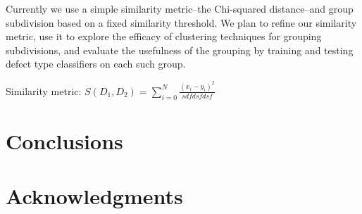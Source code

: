 \documentclass{sig-alternate-05-2015}
\begin{document}
Currently we use a simple similarity metric--the Chi-squared distance--and group subdivision
based on a fixed similarity threshold. We plan to refine our similarity metric, use it
to explore the efficacy of clustering techniques for grouping subdivisions, and evaluate the
usefulness of the grouping by training and testing defect type classifiers on each such group. 

Similarity metric:
$S(D_1,D_2) = \sum\limits_{i=0}^{N}\frac{(x_i - y_i)^2}{sdfdsfdsf}$


\section{Conclusions}
\section{Acknowledgments}

%

%
%
\end{document}
